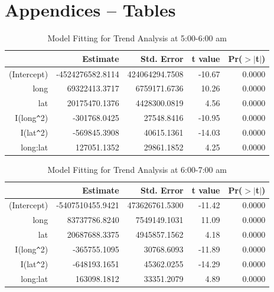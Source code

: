 \documentclass[hidelinks,12pt]{article}
\begin{document}
	
	\clearpage
	\section{Appendices -- Tables} \label{sec:appb}
	\begin{table}[!ht]
		\centering
		\caption{Model Fitting for Trend Analysis at 5:00-6:00 am \label{tbl:trend5}}
		\begin{tabular}{rrrrr}
			\hline
			& Estimate & Std. Error & t value & Pr($>$$|$t$|$) \\ 
			\hline
			(Intercept) & -4524276582.8114 & 424064294.7508 & -10.67 & 0.0000 \\ 
			long & 69322413.3717 & 6759171.6736 & 10.26 & 0.0000 \\ 
			lat & 20175470.1376 & 4428300.0819 & 4.56 & 0.0000 \\ 
			I(long\verb|^|2) & -301768.0425 & 27548.8416 & -10.95 & 0.0000 \\ 
			I(lat\verb|^|2) & -569845.3908 & 40615.1361 & -14.03 & 0.0000 \\ 
			long:lat & 127051.1352 & 29861.1852 & 4.25 & 0.0000 \\ 
			\hline
		\end{tabular}
	\end{table}
	\begin{table}[!ht]
		\centering
		\caption{Model Fitting for Trend Analysis at 6:00-7:00 am \label{tbl:trend6}}
		\begin{tabular}{rrrrr}
			\hline
			& Estimate & Std. Error & t value & Pr($>$$|$t$|$) \\ 
			\hline
			(Intercept) & -5407510455.9421 & 473626761.5300 & -11.42 & 0.0000 \\ 
			long & 83737786.8240 & 7549149.1031 & 11.09 & 0.0000 \\ 
			lat & 20687688.3375 & 4945857.1562 & 4.18 & 0.0000 \\ 
			I(long\verb|^|2) & -365755.1095 & 30768.6093 & -11.89 & 0.0000 \\ 
			I(lat\verb|^|2) & -648193.1651 & 45362.0255 & -14.29 & 0.0000 \\ 
			long:lat & 163098.1812 & 33351.2079 & 4.89 & 0.0000 \\ 
			\hline
		\end{tabular}
	\end{table}
\end{document}
